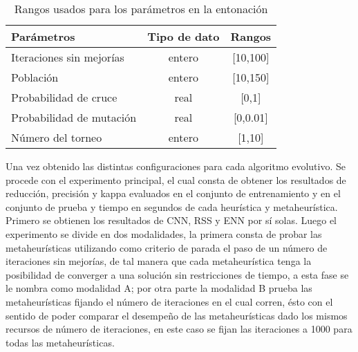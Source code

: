 \begin{table}[]
\centering
\begin{tabular}{l c c}
\hline
Parámetros & Tipo de dato & Rangos \\
\hline
\hline
Iteraciones sin mejorías & entero           &  [10,100]       \\
Población                & entero           &  [10,150]       \\
Probabilidad de cruce    & real             &  [0,1]          \\
Probabilidad de mutación & real             &  [0,0.01]      \\
Número del torneo        & entero           &  [1,10]         \\  

\hline
\end{tabular}
\caption{Rangos usados para los parámetros en la entonación}
\label{rangos}
\end{table}

Una vez obtenido las distintas configuraciones para cada algoritmo evolutivo. Se procede con el experimento principal, el cual consta de obtener los resultados de reducción, precisión y kappa evaluados en el conjunto de entrenamiento y en el conjunto de prueba y tiempo en segundos de cada heurística y metaheurística. Primero se obtienen los resultados de CNN, RSS y ENN por sí solas. Luego el experimento se divide en dos modalidades, la primera consta de probar las metaheurísticas utilizando como criterio de parada el paso de un número de iteraciones sin mejorías, de tal manera que cada metaheurística tenga la posibilidad de converger a una solución sin restricciones de tiempo, a esta fase se le nombra como modalidad A; por otra parte la modalidad B prueba las metaheurísticas fijando el número de iteraciones en el cual corren, ésto con el sentido de poder comparar el desempeño de las metaheurísticas dado los mismos recursos de número de iteraciones, en este caso se fijan las iteraciones a 1000 para todas las metaheurísticas.

